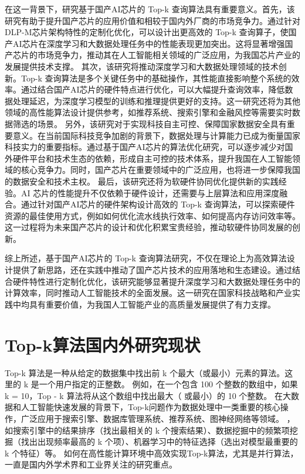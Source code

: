在这一背景下，研究基于国产AI芯片的 Top-k 查询算法具有重要意义。首先，该研究有助于提升国产芯片的应用价值和相较于国内外厂商的市场竞争力。通过针对DLP-M芯片架构特性的定制化优化，可以设计出更高效的 Top-k 查询算子，使国产AI芯片在深度学习和大数据处理任务中的性能表现更加突出。这将显著增强国产芯片的市场竞争力，推动其在人工智能相关领域的广泛应用，为我国芯片产业的发展提供技术支撑。
其次，该研究将推动深度学习和大数据处理领域的技术创新。Top-k 查询算法是多个关键任务中的基础操作，其性能直接影响整个系统的效率。通过结合国产AI芯片的硬件特点进行优化，可以大幅提升查询效率，降低数据处理延迟，为深度学习模型的训练和推理提供更好的支持。这一研究还将为其他领域的高性能算法设计提供参考，如推荐系统、搜索引擎和金融风控等需要实时数据筛选的场景。
另外，该研究对于实现科技自主可控、保障国家数据安全具有重要意义。在当前国际科技竞争加剧的背景下，数据处理与计算能力已成为衡量国家科技实力的重要指标。通过基于国产AI芯片的算法优化研究，可以逐步减少对国外硬件平台和技术生态的依赖，形成自主可控的技术体系，提升我国在人工智能领域的核心竞争力。同时，国产芯片在重要领域中的广泛应用，也将进一步保障我国的数据安全和技术主权。
最后，该研究还将为软硬件协同优化提供新的实践经验。AI 芯片的性能提升不仅依赖于硬件设计，还需要与上层算法和应用深度融合。通过针对国产AI芯片的硬件架构设计高效的 Top-k 查询算法，可以探索硬件资源的最佳使用方式，例如如何优化流水线执行效率、如何提高内存访问效率等。这一过程将为未来国产芯片的设计和优化积累宝贵经验，推动软硬件协同发展的创新。

综上所述，基于国产AI芯片的 Top-k 查询算法研究，不仅在理论上为高效算法设计提供了新思路，还在实践中推动了国产芯片技术的应用落地和生态建设。通过结合硬件特性进行定制化优化，该研究能够显著提升深度学习和大数据处理任务中的计算效率，同时推动人工智能技术的全面发展。这一研究在国家科技战略和产业实践中均具有重要价值，为我国人工智能产业的高质量发展提供了有力支撑。

\section{Top-k算法国内外研究现状}

Top-k 算法是一种从给定的数据集中找出前 k 个最大（或最小）元素的算法。这里的 k 是一个用户指定的正整数。
例如，在一个包含 100 个整数的数组中，如果 k = 10，Top - k 算法将从这个数组中找出最大（
或最小）的 10 个整数。
在大数据和人工智能快速发展的背景下，Top-k问题作为数据处理中一类重要的核心操作，广泛应用于搜索引擎、数据库管理系统、推荐系统、图神经网络等领域。
，如搜索引擎中的结果排序（找出最相关的 k 个搜索结果）、数据挖掘中的频繁项挖掘（找出出现频率最高的 k 个项）、机器学习中的特征选择（选出对模型最重要的 k 个特征）等。
如何在高性能计算环境中高效实现Top-k算法，尤其是并行算法，一直是国内外学术界和工业界关注的研究重点。

